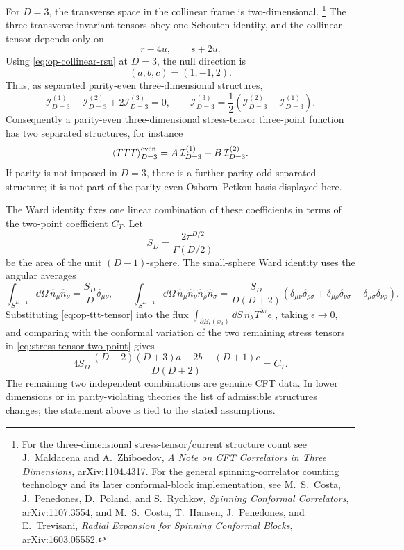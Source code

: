 For \(D=3\), the transverse space in the collinear frame is two-dimensional.
\footnote{For the three-dimensional stress-tensor/current structure count see
J.~Maldacena and A.~Zhiboedov, \emph{A Note on CFT Correlators in Three
Dimensions}, arXiv:1104.4317.  For the general spinning-correlator counting
technology and its later conformal-block implementation, see M.~S.~Costa,
J.~Penedones, D.~Poland, and S.~Rychkov, \emph{Spinning Conformal
Correlators}, arXiv:1107.3554, and M.~S.~Costa, T.~Hansen, J.~Penedones, and
E.~Trevisani, \emph{Radial Expansion for Spinning Conformal Blocks},
arXiv:1603.05552.}
The three transverse invariant tensors obey one Schouten identity, and the
collinear tensor depends only on
\begin{equation}
  r-4u,
  \qquad
  s+2u .
  \label{eq:op-d3-two-invariants}
\end{equation}
Using \eqref{eq:op-collinear-rsu} at \(D=3\), the null direction is
\[
  (a,b,c)=(1,-1,2).
\]
Thus, as separated parity-even three-dimensional structures,
\begin{equation}
  \mathcal I^{(1)}_{D=3}
  -
  \mathcal I^{(2)}_{D=3}
  +
  2\mathcal I^{(3)}_{D=3}
  =
  0,
  \qquad
  \mathcal I^{(3)}_{D=3}
  =
  \frac12\left(
    \mathcal I^{(2)}_{D=3}-\mathcal I^{(1)}_{D=3}
  \right).
  \label{eq:op-d3-ttt-relation}
\end{equation}
Consequently a parity-even three-dimensional stress-tensor three-point
function has two separated structures, for instance
\begin{equation}
  \left\langle TTT\right\rangle_{D=3}^{\rm even}
  =
  A\,\mathcal I^{(1)}_{D=3}
  +
  B\,\mathcal I^{(2)}_{D=3}.
  \label{eq:op-d3-two-ttt-structures}
\end{equation}
If parity is not imposed in \(D=3\), there is a further parity-odd separated
structure; it is not part of the parity-even Osborn--Petkou basis displayed
here.

The Ward identity fixes one
linear combination of these coefficients in terms of the two-point coefficient
\(C_T\).  Let
\[
  S_D=\frac{2\pi^{D/2}}{\Gamma(D/2)}
\]
be the area of the unit \((D-1)\)-sphere.  The small-sphere Ward identity uses
the angular averages
\[
  \int_{S^{D-1}}\dd\Omega\,\widehat n_\mu\widehat n_\nu
  =
  \frac{S_D}{D}\delta_{\mu\nu},
  \qquad
  \int_{S^{D-1}}\dd\Omega\,
  \widehat n_\mu\widehat n_\nu\widehat n_\rho\widehat n_\sigma
  =
  \frac{S_D}{D(D+2)}
  \left(
    \delta_{\mu\nu}\delta_{\rho\sigma}
    +
    \delta_{\mu\rho}\delta_{\nu\sigma}
    +
    \delta_{\mu\sigma}\delta_{\nu\rho}
  \right).
\]
Substituting \eqref{eq:op-ttt-tensor} into the flux
\(\int_{\partial B_\epsilon(x_3)}\dd S\,n_\lambda
T^{\lambda\tau}\epsilon_\tau\), taking \(\epsilon\to0\), and comparing with
the conformal variation of the two remaining stress tensors in
\eqref{eq:stress-tensor-two-point} gives
\begin{equation}
  4S_D\,
  \frac{(D-2)(D+3)a-2b-(D+1)c}{D(D+2)}
  =
  C_T .
  \label{eq:ttt-ward-ct-relation}
\end{equation}
The remaining two independent combinations are genuine CFT data.  In lower
dimensions or in parity-violating theories the list of admissible structures
changes; the statement above is tied to the stated assumptions.

